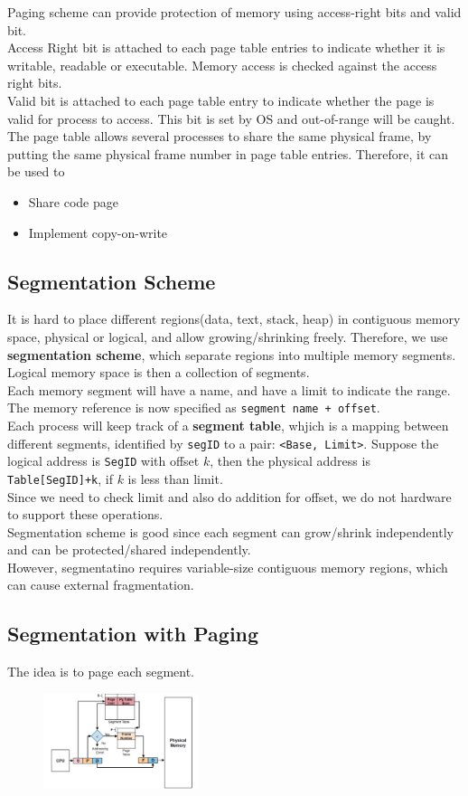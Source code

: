 \documentclass[12pt]{article}
\theoremstyle{definition}
\begin{document}
Paging scheme can provide protection of memory using access-right bits and valid bit.\\
Access Right bit is attached to each page table entries to indicate whether it is writable, readable or executable. Memory access is checked against the access right bits.\\
Valid bit is attached to each page table entry to indicate whether the page is valid for process to access. This bit is set by OS and out-of-range will be caught.\\
The page table allows several processes to share the same physical frame, by putting the same physical frame number in page table entries. Therefore, it can be used to 
\begin{itemize}
  \item Share code page
  \item Implement copy-on-write
\end{itemize}
\subsection{Segmentation Scheme}
It is hard to place different regions(data, text, stack, heap) in contiguous memory space, physical or logical, and allow growing/shrinking freely. Therefore, we use \textbf{segmentation scheme}, which separate regions into multiple memory segments. Logical memory space is then a collection of segments.\\
Each memory segment will have a name, and have a limit to indicate the range. The memory reference is now specified as \texttt{segment name + offset}.\\
Each process will keep track of a \textbf{segment table}, whjich is a mapping between different segments, identified by \texttt{segID} to a pair: \texttt{<Base, Limit>}. Suppose the logical address is \texttt{SegID} with offset $k$, then the physical address is \texttt{Table[SegID]+k}, if $k$ is less than limit. \\
Since we need to check limit and also do addition for offset, we do not hardware to support these operations.\\
Segmentation scheme is good since each segment can grow/shrink independently and can be protected/shared independently.\\
However, segmentatino requires variable-size contiguous memory regions, which can cause external fragmentation.\\
\subsection{Segmentation with Paging}
The idea is to page each segment.
\begin{figure}[h]
\centering
\includegraphics[width = 0.4\textwidth]{8_1.png}
\end{figure}
\end{document}
